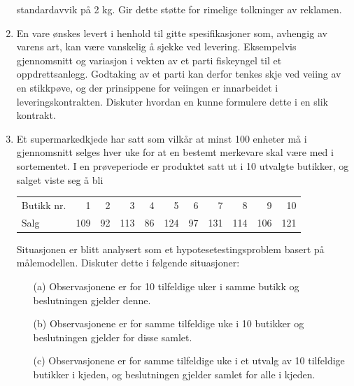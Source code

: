 \begin{enumerate}
      standardavvik på 2 kg. Gir dette støtte for rimelige tolkninger
      av reklamen.
\item En vare ønskes levert i henhold til gitte spesifikasjoner som,
    avhengig av varens art, kan være vanskelig å sjekke ved levering.
     Eksempelvis gjennomsnitt og variasjon i vekten av et parti fiskeyngel
     til et oppdrettsanlegg. Godtaking av et parti kan derfor tenkes skje
     ved veiing av en stikkpøve, og der prinsippene for veiingen
     er innarbeidet i leveringskontrakten. Diskuter hvordan en kunne
     formulere dette i en slik kontrakt.
\item Et supermarkedkjede har satt som vilkår at minst 100 enheter må
     i gjennomsnitt selges hver uke for at en bestemt merkevare skal være
     med i sortementet. I en prøveperiode er produktet satt ut i 10
     utvalgte butikker, og salget viste seg å bli
    \begin{center}
    \begin{tabular}{lrrrrrrrrrr}
   Butikk nr. & 1 & 2 & 3 & 4 & 5 & 6 & 7 & 8 & 9 & 10 \\
   Salg       &109&92&113& 86&124& 97&131&114&106&121
    \end{tabular}
    \end{center}
    Situasjonen er blitt analysert som et hypotesetestingsproblem basert på
    målemodellen. Diskuter dette i følgende situasjoner:
   \begin{itemize}
   \item[(a)] Observasjonene er for 10 tilfeldige uker i samme butikk og
         beslutningen gjelder denne.
   \item[(b)] Observasjonene er for samme tilfeldige uke i 10 butikker og
         beslutningen gjelder for disse samlet.
   \item[(c)] Observasjonene er for samme tilfeldige uke i et utvalg av
           10 tilfeldige butikker i kjeden, og beslutningen gjelder samlet 
          for alle i kjeden.
\end{itemize}


\end{enumerate}
